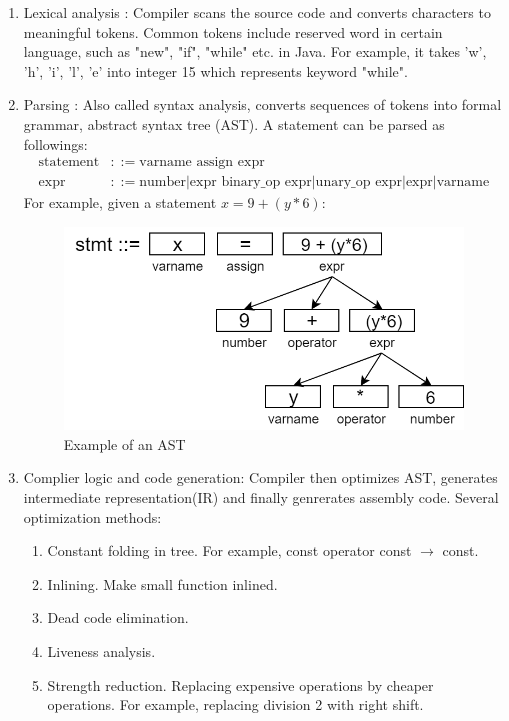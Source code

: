 \documentclass[twoside]{article}
\begin{document}
\begin{enumerate}

\item Lexical analysis :
Compiler scans the source code and converts characters to meaningful tokens. Common tokens include reserved word in certain language, such as "new", "if", "while" etc. in Java. For example, it takes 'w', 'h', 'i', 'l', 'e' into integer 15 which represents keyword "while".

\item Parsing : 
Also called syntax analysis, converts sequences of tokens into formal grammar, abstract syntax tree (AST). A statement can be parsed as followings:
\begin{equation*}
\begin{aligned}
\text{statement} &::= \text{varname assign expr} \\
\text{expr} &::= \text{number} | \text{expr binary\_op expr} | \text{unary\_op expr} | \text{expr} | \text{varname}
\end{aligned}
\end{equation*}
For example, given a statement $x = 9 + (y * 6)$:

\begin{figure}[h]
\centering
\includegraphics[scale=0.35]{AST.png}
\caption{Example of an AST}
\end{figure}

\item Complier logic and code generation:
Compiler then optimizes AST, generates intermediate representation(IR) and finally genrerates assembly code. Several optimization methods:
\begin{enumerate}
\item Constant folding in tree. For example, const operator const $\to$ const.
\item Inlining. Make small function inlined.
\item Dead code elimination.
\item Liveness analysis.
\item Strength reduction. Replacing expensive operations by cheaper operations. For example, replacing division 2 with right shift.
\end{enumerate} 


\end{enumerate}
\end{document}
